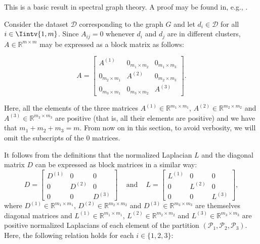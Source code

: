 This is a basic result in spectral graph theory.
A proof may be found in, e.g., \cite{mahoney}.

Consider the dataset $\mathcal D$ corresponding to the graph $G$ and let $d_i \in \mathcal D$ for all $i \in \Iintv{1,m}$. Since $A_{ij} = 0$ whenever $d_i$ and $d_j$ are in different clusters, $A \in \mathbb{R} ^{m \times m}$ may be expressed as a block matrix as follows:

\begin{equation}
   A = 
   \begin{bmatrix}
      A^{(1)} & 0_{m_1 \times m_2} & 0_{m_1 \times m_3} \\
      0_{m_2 \times m_1} & A^{(2)} & 0_{m_2 \times m_3} \\
      0_{m_3 \times m_1} & 0_{m_3 \times m_2} & A^{(3)}
   \end{bmatrix}.
\end{equation}

Here, all the elements of the three matrices $A^{(1)} \in \mathbb R^{m_1 \times m_1}$, $A^{(2)} \in \mathbb R^{m_2 \times m_2}$ and $A^{(3)} \in \mathbb R ^{m_3 \times m_3}$ are positive (that is, all their elements are positive) and we have that $m_1+m_2+m_3 = m$. 
From now on in this section, to avoid verbosity, we will omit the subscripts of the $0$ matrices.

It follows from the definitions that the normalized Laplacian $L$ and the diagonal matrix $D$ can be expressed as block matrices in a similar way:
\begin{equation}
 D =
   \begin{bmatrix}
      D^{(1)} & 0 & 0 \\
      0 & D^{(2)} & 0 \\
      0 & 0 & D^{(3)}
   \end{bmatrix}
   \,\,\,\,\,\text{ and }\,\,\,\,\,
   L = 
   \begin{bmatrix}
      L^{(1)} & 0 & 0 \\
      0 & L^{(2)} & 0 \\
      0 & 0 & L^{(3)}
   \end{bmatrix},
\end{equation}
where $D^{(1)} \in \mathbb R ^{m_1 \times m_1}$, $D^{(2)} \in \mathbb R ^{m_2 \times m_2}$ and $D^{(3)} \in \mathbb R ^{m_3 \times m_3}$ are themselves diagonal matrices and $L^{(1)} \in \mathbb R ^{m_1 \times m_1}$, $L^{(2)} \in \mathbb R ^{m_2 \times m_2}$ and $L^{(3)} \in \mathbb R ^{m_3 \times m_3}$ are positive normalized Laplacians of each element of the partition $(\mathcal P_1, \mathcal P_2, \mathcal P_3)$.
Here, the following relation holds for each $i \in \{1, 2, 3 \}$:

